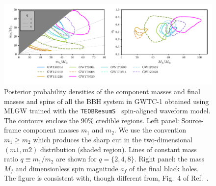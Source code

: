 \documentclass[twocolumn,showpacs,preprintnumbers,nofootinbib,prd,
superscriptaddress,10pt]{revtex4-1}
\begin{document}
\begin{figure}[t]
	\centering
    \includegraphics[width=\textwidth]{img/posterior_masses_final.pdf}
	\caption{
	Posterior probability densities of the component masses and final masses and spins 
	of all the BBH system in GWTC-1 obtained using MLGW trained with 
	the {\tt TEOBResumS}~\cite{Nagar:2020pcj} spin-aligned waveform model. 
	The contours enclose the $90\%$ credible regions. Left panel: Source-frame component 
	masses $m_1$ and $m_2$. We use the convention $m_1\geq m_2$ which produces 
	the sharp cut in the two-dimensional $(m1,m2)$ distribution (shaded region). Lines of
	constant mass ratio $q\equiv m_1/m_2$ are shown for $q=\{2,4,8\}$. Right panel: the mass $M_f$
	and dimensionless spin magnitude $a_f$ of the final black holes. The figure is consistent with, though 
	different from, Fig.~4 of Ref.~\cite{LIGOScientific:2018mvr}.
}
	\label{fig:gwtc1-summary}
\end{figure}
\end{document}
